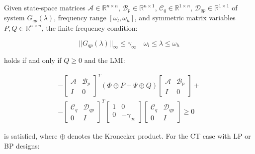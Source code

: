 \begin{lem} \label{lem:gkyp}
Given state-space matrices $\mathcal{A} \in \mathbb{R}^{n \times n}$, $\mathcal{B}_p \in \mathbb{R}^{n \times 1}$, $\mathcal{C}_q \in \mathbb{R}^{1 \times n}$, $\mathcal{D}_{qp} \in \mathbb{R}^{1 \times 1}$ of system $G_{qp}(\lambda)$, frequency range $[\omega_l, \omega_h]$, and symmetric matrix variables $P, Q \in \mathbb{R}^{n \times n}$, the finite frequency condition:

	\begin{equation*}
		||G_{qp}(\lambda)||_\infty \leq \gamma_\infty \quad \omega_l \leq \lambda \leq \omega_h
	\end{equation*}
	
	holds if and only if $Q \geq 0$ and the \gls{LMI}:

	\begin{multline}
		-\begin{bmatrix}
			\mathcal{A} & \mathcal{B}_p \\
			I & 0
		\end{bmatrix}^T
		\left(\Phi \oplus P + \Psi \oplus Q\right)
		\begin{bmatrix}
			\mathcal{A} & \mathcal{B}_p \\
			I & 0
		\end{bmatrix} + \\
		-
		\begin{bmatrix}
			\mathcal{C}_q & \mathcal{D}_{qp} \\
			0 & I
		\end{bmatrix}^T
		\begin{bmatrix}
			1 & 0 \\
			0 & -\gamma_\infty
		\end{bmatrix}
		\begin{bmatrix}
			\mathcal{C}_q & \mathcal{D}_{qp} \\
			0 & I
		\end{bmatrix}
		\geq 0 \label{eq:lmiinf}
	\end{multline}
	
	is satisfied, where $\oplus$ denotes the Kronecker product. For the \gls{CT} case with \gls{LP} or \gls{BP} designs:
	

\end{lem}
